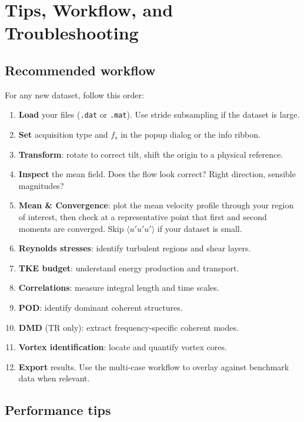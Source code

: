 \section{Tips, Workflow, and Troubleshooting}

\subsection{Recommended workflow}

For any new dataset, follow this order:

\begin{enumerate}[leftmargin=1.5em]
  \item \textbf{Load} your files (\texttt{.dat} or \texttt{.mat}). Use stride subsampling if the dataset is large.
  \item \textbf{Set} acquisition type and $f_s$ in the popup dialog or the info ribbon.
  \item \textbf{Transform}: rotate to correct tilt, shift the origin to a physical reference.
  \item \textbf{Inspect} the mean field. Does the flow look correct? Right direction, sensible magnitudes?
  \item \textbf{Mean \& Convergence}: plot the mean velocity profile through your region of interest, then check at a representative point that first and second moments are converged. Skip $\langle u'u'u' \rangle$ if your dataset is small.
  \item \textbf{Reynolds stresses}: identify turbulent regions and shear layers.
  \item \textbf{TKE budget}: understand energy production and transport.
  \item \textbf{Correlations}: measure integral length and time scales.
  \item \textbf{POD}: identify dominant coherent structures.
  \item \textbf{DMD} (TR only): extract frequency-specific coherent modes.
  \item \textbf{Vortex identification}: locate and quantify vortex cores.
  \item \textbf{Export} results. Use the multi-case workflow to overlay against benchmark data when relevant.
\end{enumerate}

\subsection{Performance tips}

